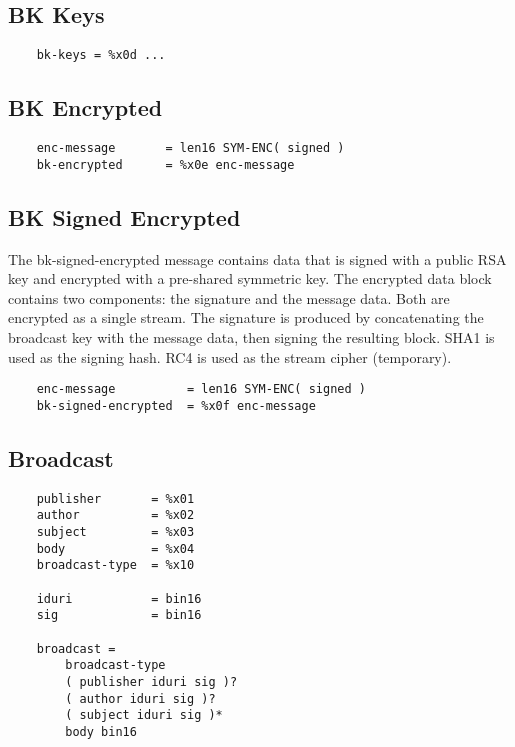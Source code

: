 \documentclass[letterpaper,11pt,oneside]{article}
\begin{document}
\subsection{BK Keys}

\vspace{10pt}
\begin{verbatim}
    bk-keys = %x0d ...
\end{verbatim}
\vspace{10pt}

\subsection{BK Encrypted}

\vspace{10pt}
\begin{verbatim}
    enc-message       = len16 SYM-ENC( signed )
    bk-encrypted      = %x0e enc-message
\end{verbatim}
\vspace{10pt}


\subsection{BK Signed Encrypted}

The bk-signed-encrypted message contains data that is signed with a public RSA
key and encrypted with a pre-shared symmetric key. The encrypted data block
contains two components: the signature and the message data. Both are encrypted
as a single stream. The signature is produced by concatenating the broadcast
key with the message data, then signing the resulting block. SHA1 is used as
the signing hash. RC4 is used as the stream cipher (temporary).

\vspace{10pt}
\begin{verbatim}
    enc-message          = len16 SYM-ENC( signed ) 
    bk-signed-encrypted  = %x0f enc-message
\end{verbatim}
\vspace{10pt}

\subsection{Broadcast}

\vspace{10pt}
\begin{verbatim}
    publisher       = %x01
    author          = %x02
    subject         = %x03
    body            = %x04
    broadcast-type  = %x10

    iduri           = bin16
    sig             = bin16 

    broadcast =
        broadcast-type
        ( publisher iduri sig )?
        ( author iduri sig )?
        ( subject iduri sig )*
        body bin16 
\end{verbatim}
\vspace{10pt}
\end{document}
